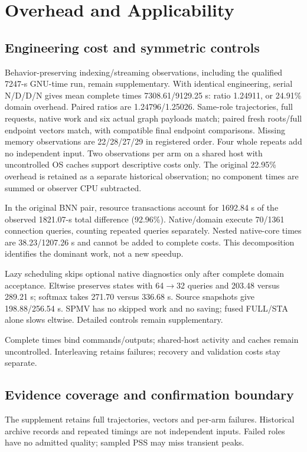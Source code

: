 \documentclass[conference,10pt]{IEEEtran}
\begin{document}
\section{Overhead and Applicability}
\subsection{Engineering cost and symmetric controls}
Behavior-preserving indexing/streaming observations, including the qualified 7247-s GNU-time run, remain supplementary. With identical engineering, serial N/D/D/N gives mean complete times 7308.61/9129.25 s: ratio 1.24911, or 24.91\% domain overhead. Paired ratios are 1.24796/1.25026. Same-role trajectories, full requests, native work and six actual graph payloads match; paired fresh roots/full endpoint vectors match, with compatible final endpoint comparisons. Missing memory observations are 22/28/27/29 in registered order. Four whole repeats add no independent input. Two observations per arm on a shared host with uncontrolled OS caches support descriptive costs only. The original 22.95\% overhead is retained as a separate historical observation; no component times are summed or observer CPU subtracted.

In the original BNN pair, resource transactions account for 1692.84 s of the observed 1821.07-s total difference (92.96\%). Native/domain execute 70/1361 connection queries, counting repeated queries separately. Nested native-core times are 38.23/1207.26 s and cannot be added to complete costs. This decomposition identifies the dominant work, not a new speedup.

Lazy scheduling skips optional native diagnostics only after complete domain acceptance. Eltwise preserves states with 64$\to$32 queries and 203.48 versus 289.21 s; softmax takes 271.70 versus 336.68 s. Source snapshots give 198.88/256.54 s. SPMV has no skipped work and no saving; fused FULL/STA alone slows eltwise. Detailed controls remain supplementary.



Complete times bind commands/outputs; shared-host activity and caches remain uncontrolled. Interleaving retains failures; recovery and validation costs stay separate.

\subsection{Evidence coverage and confirmation boundary}
The supplement retains full trajectories, vectors and per-arm failures. Historical archive records and repeated timings are not independent inputs. Failed roles have no admitted quality; sampled PSS may miss transient peaks.
\end{document}
